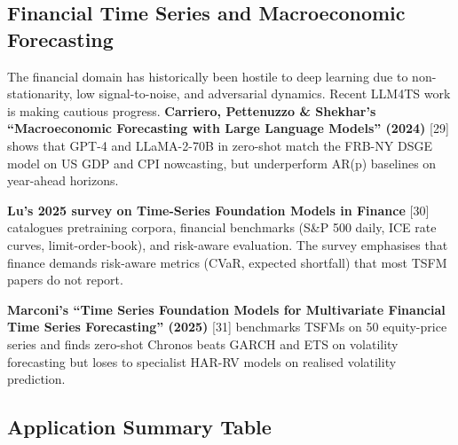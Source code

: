 \subsection{Financial Time Series and Macroeconomic Forecasting}\label{financial-time-series-and-macroeconomic-forecasting}

The financial domain has historically been hostile to deep learning due to non-stationarity, low signal-to-noise, and adversarial dynamics. Recent LLM4TS work is making cautious progress. \textbf{Carriero, Pettenuzzo \& Shekhar's ``Macroeconomic Forecasting with Large Language Models'' (2024)} {[}29{]} shows that GPT-4 and LLaMA-2-70B in zero-shot match the FRB-NY DSGE model on US GDP and CPI nowcasting, but underperform AR(p) baselines on year-ahead horizons.

\textbf{Lu's 2025 survey on Time-Series Foundation Models in Finance} {[}30{]} catalogues pretraining corpora, financial benchmarks (S\&P 500 daily, ICE rate curves, limit-order-book), and risk-aware evaluation. The survey emphasises that finance demands risk-aware metrics (CVaR, expected shortfall) that most TSFM papers do not report.

\textbf{Marconi's ``Time Series Foundation Models for Multivariate Financial Time Series Forecasting'' (2025)} {[}31{]} benchmarks TSFMs on 50 equity-price series and finds zero-shot Chronos beats GARCH and ETS on volatility forecasting but loses to specialist HAR-RV models on realised volatility prediction.

\subsection{Application Summary Table}\label{application-summary-table}

